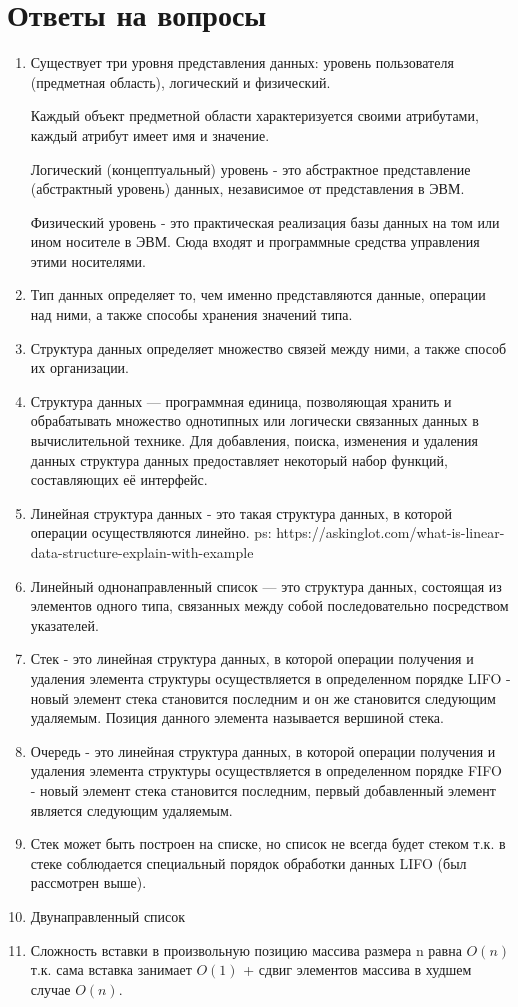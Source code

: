 \documentclass[a4paper, 14pt]{extarticle}
\begin{document}

\newpage
\tableofcontents
\newpage
\section{Ответы на вопросы}
\begin{enumerate}
  \item Существует три уровня представления данных: уровень пользователя (предметная область),
    логический и физический.

Каждый объект предметной области характеризуется своими атрибутами,
каждый атрибут имеет имя и значение. 

Логический (концептуальный) уровень - это абстрактное представление
(абстрактный уровень) данных, независимое от представления в ЭВМ.

Физический уровень - это практическая реализация базы данных на том или ином
носителе в ЭВМ. Сюда входят и программные средства управления этими носителями.
\item Тип данных определяет то, чем именно представляются данные, операции над ними, а также способы
хранения значений типа.
\item Структура данных определяет множество связей между ними, а также способ их организации.
\item Структура данных — программная единица, позволяющая хранить и обрабатывать
  множество однотипных или логически связанных данных в вычислительной технике.
  Для добавления, поиска, изменения и удаления данных структура данных
  предоставляет некоторый набор функций, составляющих её интерфейс.
\item Линейная структура данных - это такая структура данных, в которой
  операции осуществляются линейно. ps: https://askinglot.com/what-is-linear-data-structure-explain-with-example
\item Линейный однонаправленный список — это структура данных, состоящая из элементов
одного типа, связанных между собой последовательно посредством указателей.
\item Стек - это линейная структура данных, в которой операции получения и удаления
  элемента структуры осуществляется в определенном порядке LIFO - новый элемент
  стека становится последним и он же становится следующим удаляемым.
  Позиция данного элемента называется вершиной стека.
\item Очередь - это линейная структура данных, в которой операции получения и удаления
  элемента структуры осуществляется в определенном порядке FIFO - новый элемент
  стека становится последним, первый добавленный элемент является следующим
  удаляемым.
\item Стек может быть построен на списке, но список не всегда будет стеком
  т.к. в стеке соблюдается специальный порядок обработки данных LIFO
  (был рассмотрен выше).
\item Двунаправленный список
\item Сложность вставки в произвольную позицию массива размера n равна $O(n)$
  т.к. сама вставка занимает $O(1)$ + сдвиг элементов массива в худшем
  случае  $O(n)$.


\end{enumerate}
\end{document}
